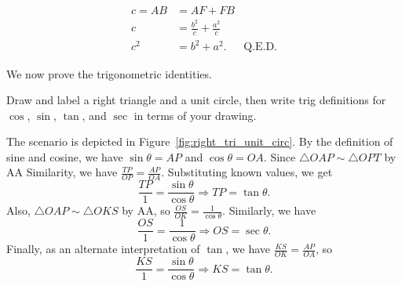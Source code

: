 \documentclass[../gatm_answers.tex]{subfiles}
\begin{document}
\begin{align*}
c=AB &= AF+FB \\
c &= \frac{b^2}{c}+\frac{a^2}{c} \\
c^2 &= b^2 + a^2. & \text{Q.E.D.}
\end{align*}

\begin{outer_problem}
\item We now prove the trigonometric identities.
\end{outer_problem}

\begin{inner_problem}
\item Draw and label a right triangle and a unit circle, then write trig definitions for $\cos$, $\sin$, $\tan$, and $\sec$ in terms of your drawing.
\end{inner_problem}

\noindent The scenario is depicted in Figure~\ref{fig:right_tri_unit_circ}. By the definition of sine and cosine, we have $\sin\theta=AP$ and $\cos\theta=OA$. Since $\triangle OAP \sim \triangle OPT$ by AA Similarity, we have $\frac{TP}{OP}=\frac{AP}{OA}$. Substituting known values, we get $$\frac{TP}{1}=\frac{\sin\theta}{\cos\theta}\Longrightarrow TP=\tan\theta.$$ Also, $\triangle OAP \sim \triangle OKS$ by AA, so $\frac{OS}{OK}=\frac{1}{\cos\theta}$. Similarly, we have $$\frac{OS}{1}=\frac{1}{\cos\theta}\Longrightarrow OS=\sec\theta.$$ Finally, as an alternate interpretation of $\tan$, we have $\frac{KS}{OK}=\frac{AP}{OA}$, so $$\frac{KS}{1}=\frac{\sin\theta}{\cos\theta}\Longrightarrow KS = \tan\theta.$$
\end{document}
